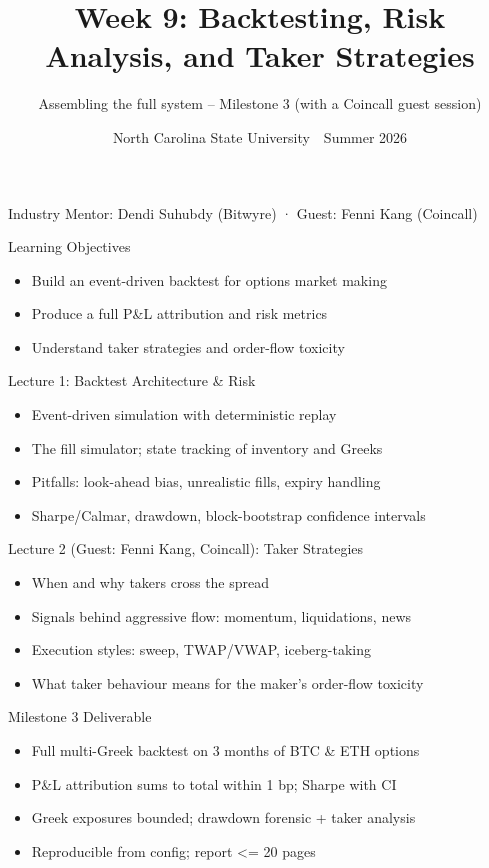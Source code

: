 \documentclass[aspectratio=169,11pt]{beamer}
\title{Week 9: Backtesting, Risk Analysis, and Taker Strategies}
\subtitle{Assembling the full system -- Milestone 3 (with a Coincall guest session)}
\date{North Carolina State University \,\textbar\, Summer 2026}
\begin{document}
\begin{frame}[plain]\titlepage
\begin{center}\tiny Industry Mentor: Dendi Suhubdy (Bitwyre)  ·  Guest: Fenni Kang (Coincall)\end{center}\end{frame}
\begin{frame}{Learning Objectives}
\begin{itemize}
  \item Build an event-driven backtest for options market making
  \item Produce a full P\&L attribution and risk metrics
  \item Understand taker strategies and order-flow toxicity
\end{itemize}\end{frame}
\begin{frame}{Lecture 1: Backtest Architecture \& Risk}
\begin{itemize}
  \item Event-driven simulation with deterministic replay
  \item The fill simulator; state tracking of inventory and Greeks
  \item Pitfalls: look-ahead bias, unrealistic fills, expiry handling
  \item Sharpe/Calmar, drawdown, block-bootstrap confidence intervals
\end{itemize}\end{frame}
\begin{frame}{Lecture 2 (Guest: Fenni Kang, Coincall): Taker Strategies}
\begin{itemize}
  \item When and why takers cross the spread
  \item Signals behind aggressive flow: momentum, liquidations, news
  \item Execution styles: sweep, TWAP/VWAP, iceberg-taking
  \item What taker behaviour means for the maker's order-flow toxicity
\end{itemize}\end{frame}
\begin{frame}{Milestone 3 Deliverable}
\begin{itemize}
  \item Full multi-Greek backtest on 3 months of BTC \& ETH options
  \item P\&L attribution sums to total within 1 bp; Sharpe with CI
  \item Greek exposures bounded; drawdown forensic + taker analysis
  \item Reproducible from config; report \textless{}= 20 pages
\end{itemize}\end{frame}
\end{document}
